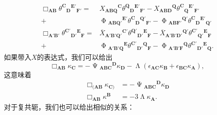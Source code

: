 \begin{equation*}
	\begin{aligned}
		\Box _{\boldsymbol{AB}} \theta ^{\boldsymbol{C}}{}{_{\boldsymbol{D}}}^{\boldsymbol{E} '}{}_{\boldsymbol{F} '} = & X{_{\boldsymbol{ABQ}}}^{\boldsymbol{C}} \theta ^{\boldsymbol{Q}}{}{_{\boldsymbol{D}}}^{\boldsymbol{E} '}{}_{\boldsymbol{F} '} -X{_{\boldsymbol{ABD}}}^{\boldsymbol{Q}} \theta ^{\boldsymbol{C}}{}{_{\boldsymbol{Q}}}^{\boldsymbol{E} '}{}_{\boldsymbol{F} '}\\
		+ & \upPhi {_{\boldsymbol{ABQ} '}}^{\boldsymbol{E} '} \theta ^{\boldsymbol{C}}{}{_{\boldsymbol{D}}}^{\boldsymbol{Q} '}{}_{\boldsymbol{F} '} -\upPhi {_{\boldsymbol{ABF} '}}^{\boldsymbol{Q} '} \theta ^{\boldsymbol{C}}{}{_{\boldsymbol{D}}}^{\boldsymbol{E} '}{}_{\boldsymbol{Q} '}\\
		\Box _{\boldsymbol{A'B} '} \theta ^{\boldsymbol{C} '}{}{_{\boldsymbol{D} '}}^{\boldsymbol{E}}{}_{\boldsymbol{F}} = & \overline{X}{_{\boldsymbol{A'B'Q} '}}^{\boldsymbol{C} '} \theta ^{\boldsymbol{Q} '}{}{_{\boldsymbol{D} '}}^{\boldsymbol{E}}{}_{\boldsymbol{F}} -\overline{X}{_{\boldsymbol{A'B'D} '}}^{\boldsymbol{Q} '} \theta ^{\boldsymbol{C} '}{}{_{\boldsymbol{Q} '}}^{\boldsymbol{E}}{}_{\boldsymbol{F}}\\
		+ & \upPhi {_{\boldsymbol{A'B'Q}}}^{\boldsymbol{E}} \theta ^{\boldsymbol{C} '}{}{_{\boldsymbol{D} '}}^{\boldsymbol{Q}}{}_{\boldsymbol{F}} -\upPhi {_{\boldsymbol{A'B'F}}}^{\boldsymbol{Q}} \theta ^{\boldsymbol{C} '}{}{_{\boldsymbol{D} '}}^{\boldsymbol{E}}{}_{\boldsymbol{Q}} .
	\end{aligned}
\end{equation*}
如果带入$X$的表达式，我们可以给出
\begin{equation*}
	\Box _{\boldsymbol{AB}} \kappa _{\boldsymbol{C}} =-\upPsi {_{\boldsymbol{ABC}}}^{\boldsymbol{D}} \kappa _{\boldsymbol{D}} -\upLambda (\epsilon _{\boldsymbol{AC}} \kappa _{\boldsymbol{B}} +\epsilon _{\boldsymbol{BC}} \kappa _{\boldsymbol{A}} ),
\end{equation*}
这意味着
\begin{equation*}
	\begin{aligned}
		\Box _{(\boldsymbol{AB}} \kappa _{\boldsymbol{C})} & =-\upPsi {_{\boldsymbol{ABC}}}^{\boldsymbol{D}} \kappa _{\boldsymbol{D}}\\
		\Box _{\boldsymbol{AB}} \kappa ^{\boldsymbol{B}} & =-3\upLambda \kappa _{\boldsymbol{A}} .
	\end{aligned}
\end{equation*}
对于复共轭，我们也可以给出相似的关系：
